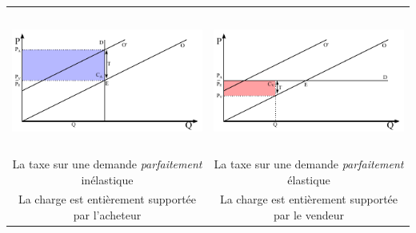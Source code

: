 \begin{center}
\begin{tabular}{cc}
		\rule[-0.9cm]{0cm}{0.5cm}\\
		
		\includegraphics[height=4.5cm]{images/graph_taxe_demande_parfaitement_inelastique.pdf} & \includegraphics[height=4.5cm]{images/graph_taxe_demande_parfaitement_elastique.pdf}\\
		La taxe sur une demande \textit{parfaitement} inélastique                              & La taxe sur une demande \textit{parfaitement} élastique\\
		La charge est entièrement supportée par l'acheteur                                   & La charge est entièrement supportée par le vendeur\\
	\end{tabular}
\end{center}